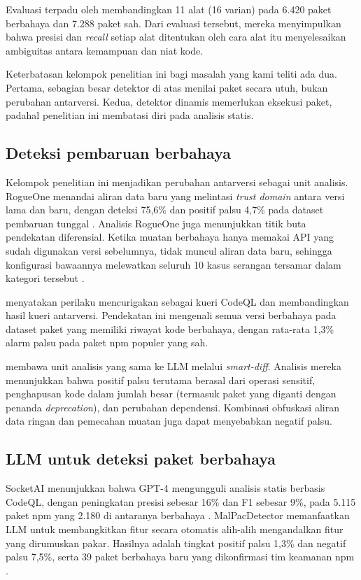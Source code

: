 \documentclass[a4paper,fleqn]{cas-dc}
\begin{document}
Evaluasi terpadu oleh \citet{guo2026effective} membandingkan 11 alat (16 varian)
pada 6.420 paket berbahaya dan 7.288 paket sah. Dari evaluasi tersebut, mereka
menyimpulkan bahwa presisi dan \emph{recall} setiap alat ditentukan oleh cara
alat itu menyelesaikan ambiguitas antara kemampuan dan niat kode.

Keterbatasan kelompok penelitian ini bagi masalah yang kami teliti ada dua.
Pertama, sebagian besar detektor di atas menilai paket secara utuh, bukan
perubahan antarversi. Kedua, detektor dinamis memerlukan eksekusi paket, padahal
penelitian ini membatasi diri pada analisis statis.

\subsection{Deteksi pembaruan berbahaya}

Kelompok penelitian ini menjadikan perubahan antarversi sebagai unit analisis.
RogueOne menandai aliran data baru yang melintasi \emph{trust domain} antara
versi lama dan baru, dengan deteksi 75,6\% dan positif palsu 4,7\% pada dataset
pembaruan tunggal \citep{sofaer2024rogueone}. Analisis RogueOne juga
menunjukkan titik buta pendekatan diferensial. Ketika muatan berbahaya hanya
memakai API yang sudah digunakan versi sebelumnya, tidak muncul aliran data
baru, sehingga konfigurasi bawaannya melewatkan seluruh 10
kasus serangan tersamar dalam kategori tersebut \citep{sofaer2024rogueone}.

\citet{froh2023differential} menyatakan perilaku mencurigakan sebagai kueri
CodeQL dan membandingkan hasil kueri antarversi. Pendekatan ini mengenali semua
versi berbahaya pada dataset paket yang memiliki riwayat kode berbahaya, dengan
rata-rata 1,3\% alarm palsu pada paket npm populer yang sah.

\citet{wyss2025evaluating} membawa unit analisis yang sama ke LLM melalui
\emph{smart-diff}. Analisis mereka menunjukkan bahwa positif palsu terutama
berasal dari operasi sensitif, penghapusan kode dalam jumlah besar (termasuk
paket yang diganti dengan penanda \emph{deprecation}), dan perubahan dependensi.
Kombinasi obfuskasi aliran data ringan dan pemecahan muatan juga dapat
menyebabkan negatif palsu.

\subsection{LLM untuk deteksi paket berbahaya}

SocketAI menunjukkan bahwa GPT-4 mengungguli analisis statis berbasis CodeQL,
dengan peningkatan presisi sebesar 16\% dan F1 sebesar 9\%, pada 5.115 paket npm
yang 2.180 di antaranya berbahaya \citep{zahan2025leveraging}. MalPacDetector
memanfaatkan LLM untuk membangkitkan fitur secara otomatis alih-alih mengandalkan
fitur yang dirumuskan pakar. Hasilnya adalah tingkat positif palsu 1,3\% dan
negatif palsu 7,5\%, serta 39 paket berbahaya baru yang dikonfirmasi tim keamanan
npm \citep{wang2025malpacdetector}.
\end{document}
